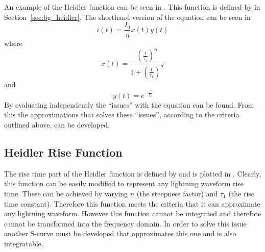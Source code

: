 An example of the Heidler function can be seen in . This function is defined by  in Section~\ref{sec:bg_heidler}.
The shorthand version of the equation can be seen in 
\begin{equation}
i(t) = \frac{I_0}{\eta} x \left( t \right) y \left( t \right)
\label{eqn:HFsmall}
\end{equation}
where
\begin{equation}
    x \left( t \right) = \frac{{\left (\frac{t}{\tau_1} \right )}^n}{1 + {\left (\frac{t}{\tau_1} \right )}^n}
    \label{eqn:HFrise}
\end{equation}
and
\begin{equation}
    y \left( t \right) = e^{-\frac{t}{\tau_2}}
    \label{eqn:HFfall}
\end{equation}
By evaluating  independently the ``issues'' with the equation can be found. From this the approximations that solves these ``issues'', according to the criteria outlined above, can be developed.

\subsection{Heidler Rise Function}
\label{sub:heidler_rise_function}

The rise time part of the Heidler function is defined by  and is plotted in . Clearly, this function can be easily modified to represent any lightning waveform rise time. These can be achieved by varying $n$ (the steepness factor) and $\tau_1$ (the rise time constant).
Therefore this function meets the criteria that it can approximate any lightning waveform. However this function cannot be integrated and therefore cannot be transformed into the frequency domain. In order to solve this issue another S-curve must be developed that approximates this one and is also integratable.

